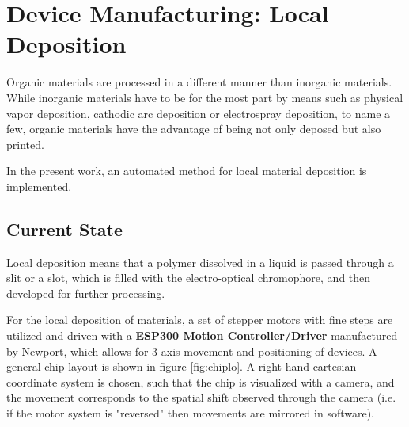 

\chapter{Device Manufacturing: Local Deposition}
\label{ch:ew}
Organic materials are processed in a different manner than inorganic materials. While inorganic materials have to be for the most part by means such as physical vapor deposition, cathodic arc deposition or electrospray deposition, to name a few, organic materials have the advantage of being not only deposed but also printed. 

In the present work, an automated method for local material deposition is implemented. 

\section{Current State}


Local deposition means that a polymer dissolved in a liquid is passed through a slit or a slot, which is filled with the electro-optical chromophore, and then developed for further processing.

For the local deposition of materials, a set of stepper motors with fine steps are utilized and driven with a \textbf{ESP300 Motion Controller/Driver} manufactured by Newport, which allows for 3-axis movement and positioning of devices. A general chip layout is shown in figure \ref{fig:chiplo}. A right-hand cartesian coordinate system is chosen, such that the chip is visualized with a camera, and the movement corresponds to the spatial shift observed through the camera (i.e. if the motor system is "reversed" then movements are mirrored in software).  \par\medskip

